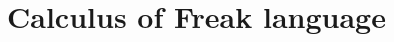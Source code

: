 \documentclass[declaration,shortabstract]{iithesis}
\theoremstyle{definition} \newtheorem{definition}{Definition}[chapter]
\theoremstyle{remark} \newtheorem{remark}[definition]{Observation}
\theoremstyle{plain} \newtheorem{theorem}[definition]{Theorem}
\theoremstyle{plain} \newtheorem{lemma}[definition]{Lemma}
\begin{document}






\chapter{Calculus of Freak language}\label{chapter:calculus-of-freak-language}
\end{document}
